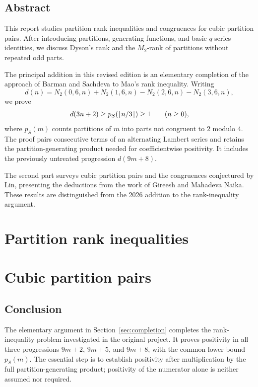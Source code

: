 \documentclass[12pt,a4paper]{report}
\DeclarePairedDelimiter{\floor}{\lfloor}{\rfloor}
\theoremstyle{plain}
\theoremstyle{definition}
\theoremstyle{remark}
\begin{document}
\chapter*{Abstract}
This report studies partition rank inequalities and congruences for cubic
partition pairs. After introducing partitions, generating functions, and
basic $q$-series identities, we discuss Dyson's rank and the $M_2$-rank of
partitions without repeated odd parts.

The principal addition in this revised edition is an elementary completion
of the approach of Barman and Sachdeva to Mao's rank inequality. Writing
\[
 d(n)=N_2(0,6,n)+N_2(1,6,n)-N_2(2,6,n)-N_2(3,6,n),
\]
we prove
\[
 d(3n+2)\ge p_S(\floor{n/3})\ge1\qquad(n\ge0),
\]
where $p_S(m)$ counts partitions of $m$ into parts not congruent to $2$
modulo $4$. The proof pairs consecutive terms of an alternating Lambert
series and retains the partition-generating product needed for
coefficientwise positivity. It includes the previously untreated
progression $d(9m+8)$.

The second part surveys cubic partition pairs and the congruences
conjectured by Lin, presenting the deductions from the work of Gireesh and
Mahadeva Naika. These results are distinguished from the 2026 addition to
the rank-inequality argument.

\tableofcontents
\clearpage
{}
\part{Partition rank inequalities}




\part{Cubic partition pairs}


\chapter*{Conclusion}
The elementary argument in Section~\ref{sec:completion} completes the
rank-inequality problem investigated in the original project. It proves
positivity in all three progressions $9m+2$, $9m+5$, and $9m+8$, with the
common lower bound $p_S(m)$. The essential step is to establish positivity
after multiplication by the full partition-generating product; positivity
of the numerator alone is neither assumed nor required.
\end{document}
